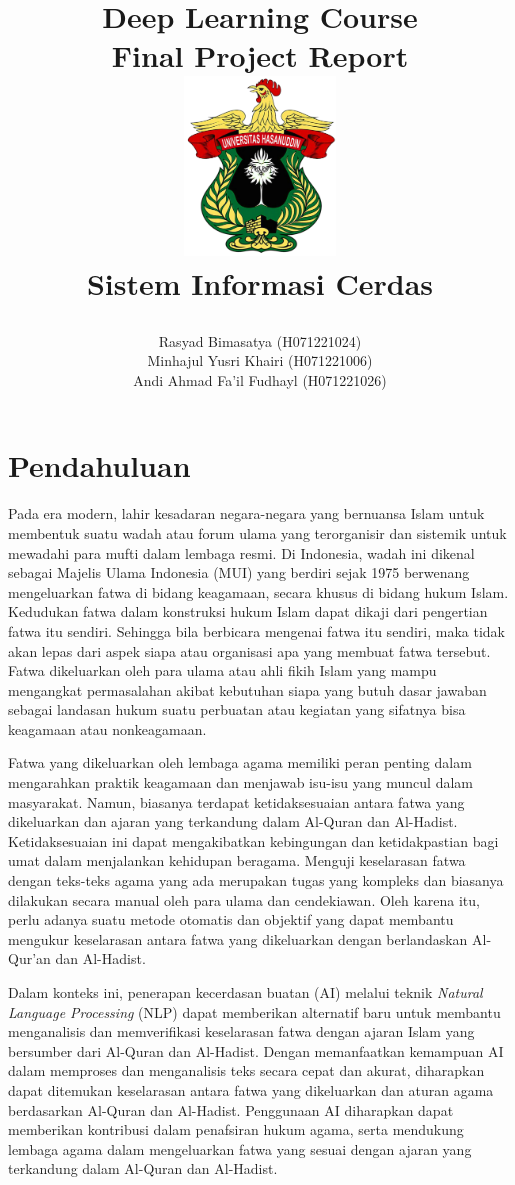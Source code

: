 \documentclass[12pt,a4paper]{article}
\title{
    \begin{center}
        \textbf{\Huge Deep Learning Course \\ Final Project Report} \\
        \vspace{1cm}
        \includegraphics[width=0.3\textwidth]{images/logo_unhas.png} \\ 
        \vspace{1cm}
        \textbf{\Large Sistem Informasi Cerdas} 
        \vspace{2cm} 
    \end{center}
}
\author{Rasyad Bimasatya (H071221024)\\ Minhajul Yusri Khairi (H071221006) \\ Andi Ahmad Fa'il Fudhayl (H071221026)}
\date{
    \begin{center}
        \vspace{5cm}
        \textbf{Universitas Hasanuddin} \\
        Makassar, Indonesia \\
        \today
    \end{center}
}
\begin{document}
\maketitle

\newpage
\tableofcontents
\newpage

\section{Pendahuluan}

Pada era modern, lahir kesadaran negara-negara yang bernuansa Islam untuk membentuk suatu wadah atau forum ulama yang terorganisir dan sistemik untuk mewadahi para mufti dalam lembaga resmi. Di Indonesia, wadah ini dikenal sebagai Majelis Ulama Indonesia (MUI) yang berdiri sejak 1975 berwenang mengeluarkan fatwa di bidang keagamaan, secara khusus di bidang hukum Islam. Kedudukan fatwa dalam konstruksi hukum Islam dapat dikaji dari pengertian fatwa itu sendiri. Sehingga bila berbicara mengenai fatwa itu sendiri, maka tidak akan lepas dari aspek siapa atau organisasi apa yang membuat fatwa tersebut. Fatwa dikeluarkan oleh para ulama atau ahli fikih Islam yang mampu mengangkat permasalahan akibat kebutuhan siapa yang butuh dasar jawaban sebagai landasan hukum suatu perbuatan atau kegiatan yang sifatnya bisa keagamaan atau nonkeagamaan. 

Fatwa yang dikeluarkan oleh lembaga agama memiliki peran penting dalam mengarahkan praktik keagamaan dan menjawab isu-isu yang muncul dalam masyarakat. Namun, biasanya terdapat ketidaksesuaian antara fatwa yang dikeluarkan dan ajaran yang terkandung dalam Al-Quran dan Al-Hadist. Ketidaksesuaian ini dapat mengakibatkan kebingungan dan ketidakpastian bagi umat dalam menjalankan kehidupan beragama. Menguji keselarasan fatwa dengan teks-teks agama yang ada merupakan tugas yang kompleks dan biasanya dilakukan secara manual oleh para ulama dan cendekiawan. Oleh karena itu, perlu adanya suatu metode otomatis dan objektif yang dapat membantu mengukur keselarasan antara fatwa yang dikeluarkan dengan berlandaskan Al-Qur’an dan Al-Hadist. 

Dalam konteks ini, penerapan kecerdasan buatan (AI) melalui teknik\textit{ Natural Language Processing} (NLP) dapat memberikan alternatif baru untuk membantu menganalisis dan memverifikasi keselarasan fatwa dengan ajaran Islam yang bersumber dari Al-Quran dan Al-Hadist. Dengan memanfaatkan kemampuan AI dalam memproses dan menganalisis teks secara cepat dan akurat, diharapkan dapat ditemukan keselarasan antara fatwa yang dikeluarkan dan aturan agama berdasarkan Al-Quran dan Al-Hadist. Penggunaan AI diharapkan dapat memberikan kontribusi dalam penafsiran hukum agama, serta mendukung lembaga agama dalam mengeluarkan fatwa yang sesuai dengan ajaran yang terkandung dalam Al-Quran dan Al-Hadist. 
\end{document}
